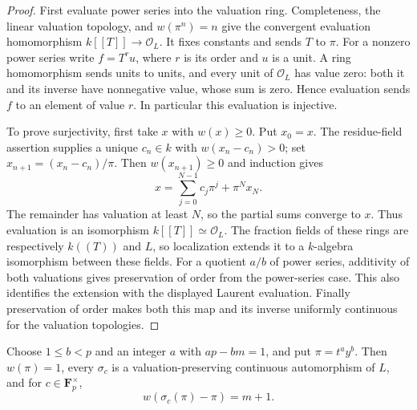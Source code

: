\begin{proof}
First evaluate power series into the valuation ring. Completeness,
the linear valuation topology, and $w(\pi^n)=n$ give the
convergent evaluation homomorphism $k[[T]]\to\mathcal O_L$.
It fixes constants and sends $T$ to $\pi$.
For a nonzero power series write $f=T^r u$, where
$r$ is its order and $u$ is a unit. A ring homomorphism sends
units to units, and every unit of $\mathcal O_L$ has value
zero: both it and its inverse have nonnegative value, whose
sum is zero. Hence evaluation sends $f$ to an element of
value $r$. In particular this evaluation is injective.

To prove surjectivity, first take $x$ with $w(x)\ge0$.
Put $x_0=x$. The residue-field assertion supplies a unique
$c_n\in k$ with $w(x_n-c_n)>0$; set
$x_{n+1}=(x_n-c_n)/\pi$. Then $w(x_{n+1})\ge0$ and induction gives
\[
 x=\sum_{j=0}^{N-1}c_j\pi^j+\pi^N x_N.
\]
The remainder has valuation at least $N$, so the partial sums
converge to $x$. Thus evaluation is an isomorphism $k[[T]]\simeq\mathcal O_L$.
The fraction fields of these rings are respectively $k((T))$
and $L$, so localization extends it to a $k$-algebra isomorphism
between these fields. For a quotient $a/b$ of power series,
additivity of both valuations gives preservation of order from
the power-series case. This also identifies the extension with
the displayed Laurent evaluation. Finally preservation of order
makes both this map and its inverse uniformly continuous for
the valuation topologies.
\end{proof}

\begin{lemma}
\label{lem:artin-schreier-translation-depth}
\leanok
Choose $1\le b<p$ and an integer $a$ with $ap-bm=1$, and put
$\pi=t^a y^b$. Then $w(\pi)=1$, every $\sigma_c$ is a
valuation-preserving continuous automorphism of $L$, and for
$c\in\mathbf F_p^\times$,
\[
 w(\sigma_c(\pi)-\pi)=m+1.
\]
\end{lemma}

